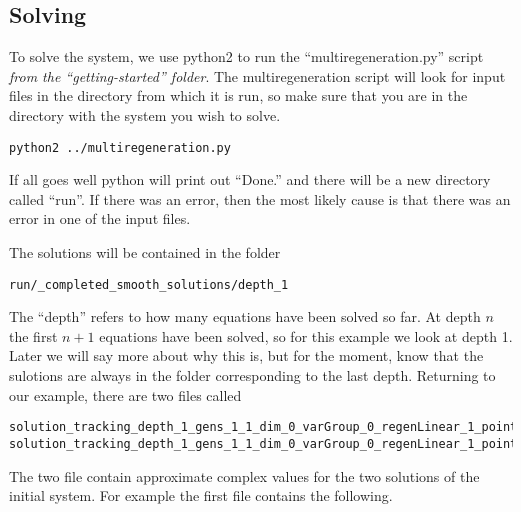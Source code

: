 \documentclass[12pt]{article}
\theoremstyle{definition}
\begin{document}
\subsection{Solving}
To solve the system, we use python2 to run the ``multiregeneration.py'' 
script \emph{from the ``getting-started'' folder}. The multiregeneration 
script will look for input files in the directory from which it is run, 
so make sure that you are in the directory with the system you wish to 
solve. 


\begin{leftbar}
\vspace{-10pt} 
\begin{verbatim}
python2 ../multiregeneration.py
\end{verbatim}\vspace{-10pt} 
\end{leftbar}

If all goes well python will print out ``Done.'' and there will be 
a new directory called ``run''. If there was an error, then the most 
likely cause is that there was an error in one of the input files.

The solutions will be contained in the folder 

\begin{leftbar}
\vspace{-10pt} 
\begin{verbatim}
run/_completed_smooth_solutions/depth_1
\end{verbatim}\vspace{-10pt} 
\end{leftbar}

The ``depth'' refers to how many equations have been solved so far. At 
depth $n$ the first $n+1$ equations have been solved, so for this 
example we look at depth 1. Later we will say more about why this is, 
but for the moment, know that the sulotions are always in the folder 
corresponding to the last depth. Returning to our example, there are two 
files called 

\begin{leftbar}
\vspace{-10pt} 
\begin{verbatim}
solution_tracking_depth_1_gens_1_1_dim_0_varGroup_0_regenLinear_1_pointId_326664877375_788310760051
solution_tracking_depth_1_gens_1_1_dim_0_varGroup_0_regenLinear_1_pointId_918720474422_183602510053 
\end{verbatim}\vspace{-10pt} 
\end{leftbar}
The two file contain approximate complex values for the two solutions of 
the initial system. For example the first file contains the following.
\end{document}
